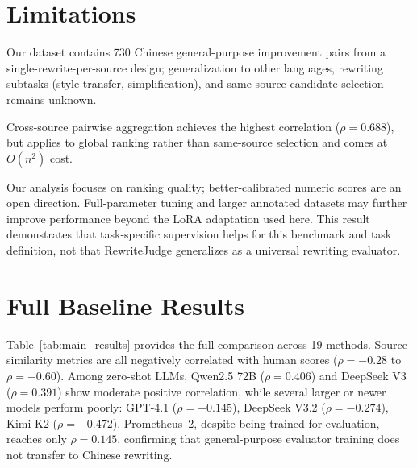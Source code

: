 \documentclass[11pt]{article}
\begin{document}
\section{Limitations}
\label{sec:limitations}

Our dataset contains 730 Chinese general-purpose improvement pairs from a single-rewrite-per-source design; generalization to other languages, rewriting subtasks (style transfer, simplification), and same-source candidate selection remains unknown.

Cross-source pairwise aggregation achieves the highest correlation ($\rho=0.688$), but applies to global ranking rather than same-source selection and comes at $O(n^2)$ cost.

Our analysis focuses on ranking quality; better-calibrated numeric scores are an open direction.
Full-parameter tuning and larger annotated datasets may further improve performance beyond the LoRA adaptation used here.
This result demonstrates that task-specific supervision helps for this benchmark and task definition, not that RewriteJudge generalizes as a universal rewriting evaluator.




\clearpage


\appendix


\section{Full Baseline Results}
\label{sec:appendix_full_results}

Table~\ref{tab:main_results} provides the full comparison across 19 methods.
Source-similarity metrics are all negatively correlated with human scores ($\rho=-0.28$ to $\rho=-0.60$).
Among zero-shot LLMs, Qwen2.5 72B ($\rho=0.406$) and DeepSeek V3 ($\rho=0.391$) show moderate positive correlation, while several larger or newer models perform poorly: GPT-4.1 ($\rho=-0.145$), DeepSeek V3.2 ($\rho=-0.274$), Kimi K2 ($\rho=-0.472$).
Prometheus~2, despite being trained for evaluation, reaches only $\rho=0.145$, confirming that general-purpose evaluator training does not transfer to Chinese rewriting.
\end{document}

